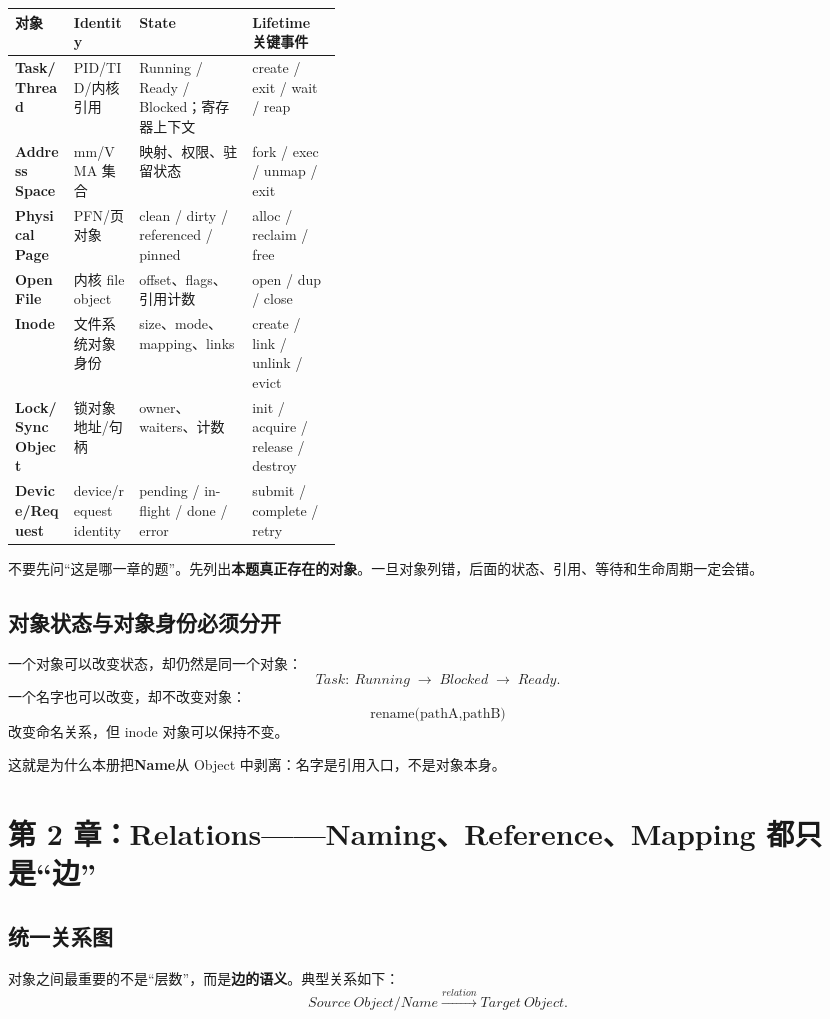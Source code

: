 \documentclass[11pt,a4paper]{ctexart}
\newcommand{\kw}[1]{\textbf{#1}}
\newcommand{\arr}{\;\longrightarrow\;}
\begin{document}
\begin{center}
\scriptsize
\renewcommand{\arraystretch}{1.25}
\begin{tabularx}{\linewidth}{>{\bfseries}p{0.18\linewidth} >{\raggedright\arraybackslash}p{0.20\linewidth} Y Y}
\toprule
对象 & Identity & State & Lifetime 关键事件 \\
\midrule
Task/Thread & PID/TID/内核引用 & Running / Ready / Blocked；寄存器上下文 & create / exit / wait / reap \\
Address Space & mm/VMA 集合 & 映射、权限、驻留状态 & fork / exec / unmap / exit \\
Physical Page & PFN/页对象 & clean / dirty / referenced / pinned & alloc / reclaim / free \\
Open File & 内核 file object & offset、flags、引用计数 & open / dup / close \\
Inode & 文件系统对象身份 & size、mode、mapping、links & create / link / unlink / evict \\
Lock/Sync Object & 锁对象地址/句柄 & owner、waiters、计数 & init / acquire / release / destroy \\
Device/Request & device/request identity & pending / in-flight / done / error & submit / complete / retry \\
\bottomrule
\end{tabularx}
\end{center}

\begin{method}[跨专题第一问]
不要先问“这是哪一章的题”。先列出\kw{本题真正存在的对象}。一旦对象列错，后面的状态、引用、等待和生命周期一定会错。
\end{method}

\subsection{对象状态与对象身份必须分开}
一个对象可以改变状态，却仍然是同一个对象：
\[
Task:\ Running\arr Blocked\arr Ready.
\]
一个名字也可以改变，却不改变对象：
\[
\text{rename(pathA,pathB)}
\]
改变命名关系，但 inode 对象可以保持不变。

这就是为什么本册把\kw{Name}从 Object 中剥离：名字是引用入口，不是对象本身。

\section{第 2 章：Relations——Naming、Reference、Mapping 都只是“边”}

\subsection{统一关系图}
对象之间最重要的不是“层数”，而是\kw{边的语义}。典型关系如下：
\[
\boxed{Source\ Object/Name\xrightarrow{relation}Target\ Object}.
\]
\end{document}
